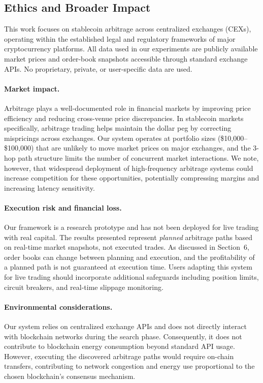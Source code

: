 \subsection{Ethics and Broader Impact}

This work focuses on stablecoin arbitrage across centralized exchanges (CEXs), operating within the established legal and regulatory frameworks of major cryptocurrency platforms. All data used in our experiments are publicly available market prices and order-book snapshots accessible through standard exchange APIs. No proprietary, private, or user-specific data are used.

\paragraph{Market impact.}
Arbitrage plays a well-documented role in financial markets by improving price efficiency and reducing cross-venue price discrepancies. In stablecoin markets specifically, arbitrage trading helps maintain the dollar peg by correcting mispricings across exchanges. Our system operates at portfolio sizes (\$10,000--\$100,000) that are unlikely to move market prices on major exchanges, and the 3-hop path structure limits the number of concurrent market interactions. We note, however, that widespread deployment of high-frequency arbitrage systems could increase competition for these opportunities, potentially compressing margins and increasing latency sensitivity.

\paragraph{Execution risk and financial loss.}
Our framework is a research prototype and has not been deployed for live trading with real capital. The results presented represent \emph{planned} arbitrage paths based on real-time market snapshots, not executed trades. As discussed in Section~6, order books can change between planning and execution, and the profitability of a planned path is not guaranteed at execution time. Users adapting this system for live trading should incorporate additional safeguards including position limits, circuit breakers, and real-time slippage monitoring.

\paragraph{Environmental considerations.}
Our system relies on centralized exchange APIs and does not directly interact with blockchain networks during the search phase. Consequently, it does not contribute to blockchain energy consumption beyond standard API usage. However, executing the discovered arbitrage paths would require on-chain transfers, contributing to network congestion and energy use proportional to the chosen blockchain's consensus mechanism.

